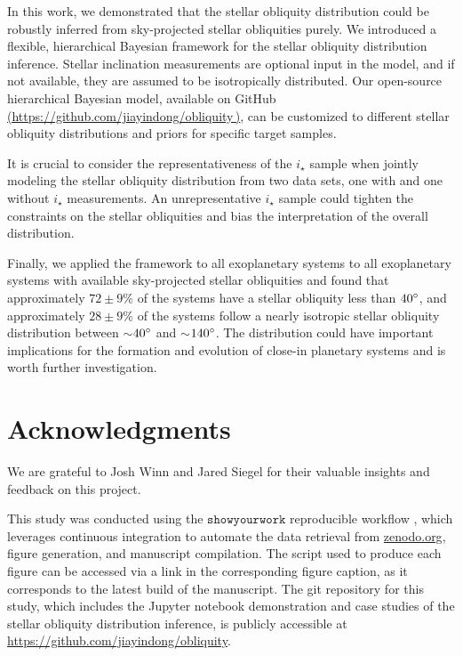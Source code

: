 \documentclass[twocolumn,times]{aastex631}
\begin{document}
In this work, we demonstrated that the stellar obliquity distribution could be robustly inferred from sky-projected stellar obliquities purely.
We introduced a flexible, hierarchical Bayesian framework for the stellar obliquity distribution inference. Stellar inclination measurements are optional input in the model, and if not available, they are assumed to be isotropically distributed.
Our open-source hierarchical Bayesian model, available on GitHub \href{https://github.com/jiayindong/obliquity}{(https://github.com/jiayindong/obliquity\,\faGithub)}, can be customized to different stellar obliquity distributions and priors for specific target samples.

It is crucial to consider the representativeness of the $i_\star$ sample when jointly modeling the stellar obliquity distribution from two data sets, one with and one without $i_\star$ measurements. An unrepresentative $i_\star$ sample could tighten the constraints on the stellar obliquities and bias the interpretation of the overall distribution.

Finally, we applied the framework to all exoplanetary systems to all exoplanetary systems with available sky-projected stellar obliquities and found that approximately $72\pm9$\% of the systems have a stellar obliquity less than $40\mbox{$^\circ$}$, and approximately $28\pm9$\% of the systems follow a nearly isotropic stellar obliquity distribution between $\sim$$40\mbox{$^\circ$}$ and $\sim$$140\mbox{$^\circ$}$.
The distribution could have important implications for the formation and evolution of close-in planetary systems and is worth further investigation.

\section*{Acknowledgments}
We are grateful to Josh Winn and Jared Siegel for their valuable insights and feedback on this project.

This study was conducted using the \href{https://github.com/showyourwork/showyourwork}{$\mathtt{showyourwork}$} reproducible workflow \citep{Luger2021}, which leverages continuous integration to automate the data retrieval from \href{https://zenodo.org/}{zenodo.org}, figure generation, and manuscript compilation.
The script used to produce each figure can be accessed via a link in the corresponding figure caption, as it corresponds to the latest build of the manuscript.
The git repository for this study, which includes the Jupyter notebook demonstration and case studies of the stellar obliquity distribution inference, is publicly accessible at \url{https://github.com/jiayindong/obliquity}.

\vspace*{5mm}



\end{document}

